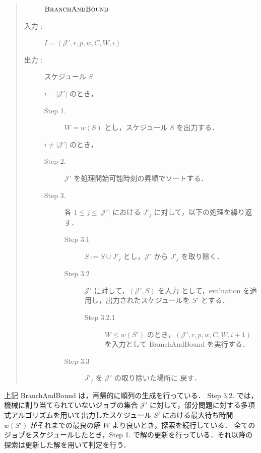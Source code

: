 \documentclass[12pt]{optlab-bachelor}
\begin{document}
\begin{quote}
  \begin{description}
    \item[] ${\mbox {\bf {\sc BranchAndBound}}}$
    \item[入力 :] $I = (\mathcal{J}',r,p,w,C,W,i)$
    \item[出力 :] スケジュール $S$
  \end{description}
  \begin{description}
    \item[] $i = |\mathcal{J}'|$ のとき，
    \begin{description}
      \item[Step 1.] $W = w(S)$ とし，スケジュール $S$ を出力する．
    \end{description}
    \item[] $i \neq |\mathcal{J}'|$ のとき，
    \begin{description}
      \item[Step 2.] $\mathcal{J}'$ を処理開始可能時刻の昇順でソートする．
      \item[Step 3.] 各 $1 \le j \le |\mathcal{J}'|$ における $J'_j$ に対して，以下の処理を繰り返す．
      \begin{description}
        \item[Step 3.1] $S := S \cup J'_j$ とし，$\mathcal{J}'$ から $J'_j$ を取り除く．
        \item[Step 3.2] $\mathcal{J}'$ に対して，$(\mathcal{J}',S)$ を入力
        として，{\sc evaluation} を適用し，出力されたスケジュールを $S'$ とする．
        \begin{description}
          \item[Step 3.2.1] $W \le w(S')$ のとき，$(\mathcal{J}',r,p,w,C,W,i + 1)$ を入力として {\sc BranchAndBound} を実行する．
        \end{description}
        \item[Step 3.3] $J'_j$ を $\mathcal{J}'$ の取り除いた場所に
        戻す．
      \end{description}
    \end{description}
  \end{description}
\end{quote}

上記 {\sc BranchAndBound} は，再帰的に順列の生成を行っている．
Step 3.2. では，機械に割り当てられていないジョブの集合 $\mathcal{J}'$ に対して，部分問題に対する多項式アルゴリズムを用いて出力したスケジュール $S'$ における最大待ち時間 $w(S')$ がそれまでの最良の解 $W$ より良いとき，探索を続行している．
全てのジョブをスケジュールしたとき，Step 1. で解の更新を行っている．それ以降の探索は更新した解を用いて判定を行う．
\end{document}
